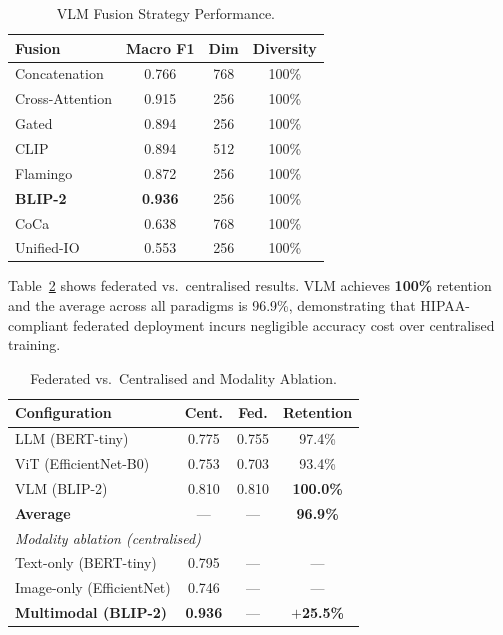 \documentclass[conference]{IEEEtran}
\begin{document}
\begin{table}[t]
\caption{VLM Fusion Strategy Performance.}
\label{tab:vlmres}
\centering\footnotesize
\setlength\tabcolsep{4pt}
\begin{tabular}{lccc}
\toprule
\textbf{Fusion} & \textbf{Macro F1} & \textbf{Dim} & \textbf{Diversity}\\
\midrule
Concatenation    & 0.766 & 768 & 100\% \\
Cross-Attention  & 0.915 & 256 & 100\% \\
Gated            & 0.894 & 256 & 100\% \\
CLIP             & 0.894 & 512 & 100\% \\
Flamingo         & 0.872 & 256 & 100\% \\
\rowcolor{llmblue!40}
\textbf{BLIP-2}  & \textbf{0.936} & 256 & 100\% \\
CoCa             & 0.638 & 768 & 100\% \\
Unified-IO       & 0.553 & 256 & 100\% \\
\bottomrule
\end{tabular}
\end{table}

Table~\ref{tab:fedcent} shows federated vs.\ centralised results. VLM
achieves \textbf{100\%} retention and the average across all paradigms
is 96.9\%, demonstrating that HIPAA-compliant federated deployment
incurs negligible accuracy cost over centralised training.

\begin{table}[t]
\caption{Federated vs.\ Centralised and Modality Ablation.}
\label{tab:fedcent}
\centering\footnotesize
\setlength\tabcolsep{4pt}
\begin{tabular}{lccc}
\toprule
\textbf{Configuration} & \textbf{Cent.} & \textbf{Fed.} & \textbf{Retention}\\
\midrule
LLM (BERT-tiny)        & 0.775 & 0.755 & 97.4\% \\
ViT (EfficientNet-B0)  & 0.753 & 0.703 & 93.4\% \\
VLM (BLIP-2)           & 0.810 & 0.810 & \textbf{100.0\%} \\
\midrule
\textbf{Average}       & ---   & ---   & \textbf{96.9\%} \\
\midrule
\multicolumn{4}{l}{\textit{Modality ablation (centralised)}}\\
Text-only (BERT-tiny)     & 0.795 & --- & ---\\
Image-only (EfficientNet) & 0.746 & --- & ---\\
\rowcolor{vlmred!30}
\textbf{Multimodal (BLIP-2)} & \textbf{0.936} & --- & \textbf{$+$25.5\%}\\
\bottomrule
\end{tabular}
\end{table}
\end{document}
